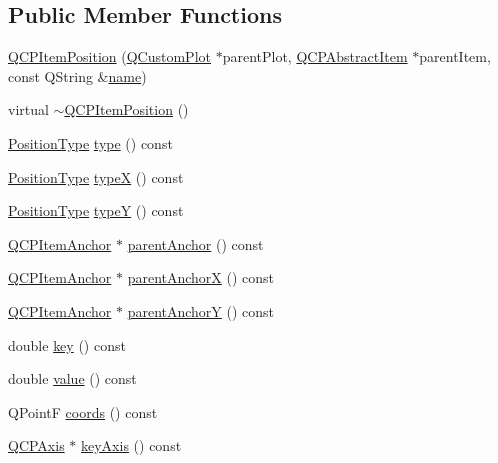 \subsection*{Public Member Functions}
\begin{DoxyCompactItemize}
\item 
\hyperlink{class_q_c_p_item_position_a6519a552bd9766354644ec24d1f26622}{Q\+C\+P\+Item\+Position} (\hyperlink{class_q_custom_plot}{Q\+Custom\+Plot} $\ast$parent\+Plot, \hyperlink{class_q_c_p_abstract_item}{Q\+C\+P\+Abstract\+Item} $\ast$parent\+Item, const Q\+String \&\hyperlink{class_q_c_p_item_anchor_aad37cdf5a3f63428f61be739014e212e}{name})
\item 
virtual \hyperlink{class_q_c_p_item_position_ad8a289016f7a62332f9c865c39ab2047}{$\sim$\+Q\+C\+P\+Item\+Position} ()
\item 
\hyperlink{class_q_c_p_item_position_aad9936c22bf43e3d358552f6e86dbdc8}{Position\+Type} \hyperlink{class_q_c_p_item_position_abfd74d86bd799306ce0295ffe433bdfc}{type} () const
\item 
\hyperlink{class_q_c_p_item_position_aad9936c22bf43e3d358552f6e86dbdc8}{Position\+Type} \hyperlink{class_q_c_p_item_position_a1415911868835701c04250566bfc681d}{typeX} () const
\item 
\hyperlink{class_q_c_p_item_position_aad9936c22bf43e3d358552f6e86dbdc8}{Position\+Type} \hyperlink{class_q_c_p_item_position_ae47bac6f679c58f9e1c78dc63d56f331}{typeY} () const
\item 
\hyperlink{class_q_c_p_item_anchor}{Q\+C\+P\+Item\+Anchor} $\ast$ \hyperlink{class_q_c_p_item_position_a0a87f9dce1af6cc9b510785991bcf1c6}{parent\+Anchor} () const
\item 
\hyperlink{class_q_c_p_item_anchor}{Q\+C\+P\+Item\+Anchor} $\ast$ \hyperlink{class_q_c_p_item_position_a605cb8b2cf6044d3d03cb1a894faf98a}{parent\+AnchorX} () const
\item 
\hyperlink{class_q_c_p_item_anchor}{Q\+C\+P\+Item\+Anchor} $\ast$ \hyperlink{class_q_c_p_item_position_aa40afec791a4339b09572922ca425ec2}{parent\+AnchorY} () const
\item 
double \hyperlink{class_q_c_p_item_position_a6fc519f1b73722a8d0cff7d4d647407e}{key} () const
\item 
double \hyperlink{class_q_c_p_item_position_acfcf86f840a7366a4299bff593d5d636}{value} () const
\item 
Q\+PointF \hyperlink{class_q_c_p_item_position_aa4ecf5b04c67049c05d37619e090820b}{coords} () const
\item 
\hyperlink{class_q_c_p_axis}{Q\+C\+P\+Axis} $\ast$ \hyperlink{class_q_c_p_item_position_a9ad34861fbfd8be8b8270c16f879169c}{key\+Axis} () const

\end{DoxyCompactItemize}
